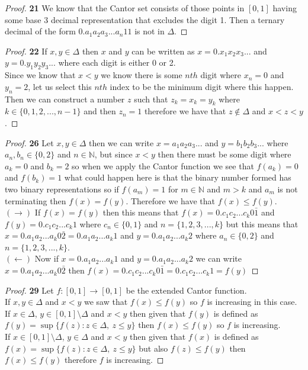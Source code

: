\documentclass[11pt]{article}
\newcommand{\N}{\mathbb{N}}
\theoremstyle{definition}
\begin{document}
	\begin{proof}{\textbf{21}}
        We know that the Cantor set consists of those points in $[0, 1]$ having some
        base 3 decimal representation that excludes the digit 1. Then a ternary decimal
        of the form $0.a_1a_2a_3...a_n11$ is not in $\Delta$.
    \end{proof}
	\begin{proof}{\textbf{22}}
        If $x,y \in \Delta$ then $x$ and $y$ can be written as $x=0.x_1x_2x_3...$
        and $y=0.y_1y_2y_3...$ where each digit is either 0 or 2.\\
        Since we know that $x<y$ we know there is some $nth$ digit where $x_n=0$ and
        $y_n=2$, let us select this $nth$ index to be the minimum digit where this
        happen. Then we can construct a number $z$ such that $z_k=x_k=y_k$ where 
        $k \in \{0,1,2,...,n-1\}$ and then $z_n = 1$ therefore we have that
        $z \notin \Delta$ and $x<z<y$.
    \end{proof}
	\begin{proof}{\textbf{26}}
        Let $x,y \in \Delta$ then we can write
        $x = a_1a_2a_3...$ and $y = b_1b_2b_3...$ where $a_n,b_n \in \{0,2\}$ and
        $n \in \N$, but since $x<y$ then there must be some digit where $a_k = 0$ and
        $b_k = 2$ so when we apply the Cantor function we see that $f(a_k) = 0$ and
        $f(b_k) = 1$ what could happen here is that the binary number formed has two
        binary representations so if $f(a_m) = 1$ for $m \in \N$ and $m > k$ and $a_m$
        is not terminating then $f(x) = f(y)$. Therefore we have that $f(x) \leq f(y)$.\\
        $(\rightarrow)$ If $f(x) = f(y)$ then this means that
        $f(x) = 0.c_1c_2... c_k0\bar{1}$ and $f(y) = 0.c_1c_2...c_k1$ where
        $c_n \in \{0,1\}$ and $n = \{1,2,3,...,k\}$ but this means that
        $x=0.a_1a_2...a_k0\bar{2} = 0.a_1a_2...a_k1$ and $y=0.a_1a_2...a_k2$
        where $a_n \in \{0,2\}$ and $n = \{1,2,3,...,k\}$.\\
        $(\leftarrow)$ Now if $x=0.a_1a_2...a_k1$ and $y=0.a_1a_2...a_k2$ we can write
        $x = 0.a_1a_2...a_k0\bar{2}$ then
        $f(x) = 0.c_1c_2...c_k0\bar{1} = 0.c_1c_2...c_k1 = f(y)$ 
    \end{proof}
\cleardoublepage
	\begin{proof}{\textbf{29}}
        Let $f: [0,1] \rightarrow [0,1]$ be the extended Cantor function.\\
        If $x,y \in \Delta$ and $x < y$ we saw that $f(x)\leq f(y)$ so $f$ is increasing
        in this case.\\
        If $x \in \Delta$, $y \in [0,1]\setminus \Delta$ and $x<y$ then given that
        $f(y)$ is defined as $f(y) = \sup\{f(z): z \in \Delta,~z \leq y\}$ then
        $f(x) \leq f(y)$ so $f$ is increasing.\\
        If $x \in [0,1]\setminus \Delta$, $y \in \Delta$ and $x<y$ then given that
        $f(x)$ is defined as $f(x) = \sup\{f(z): z \in \Delta,~z \leq y\}$ but also
        $f(z) \leq f(y)$ then $f(x) \leq f(y)$ therefore $f$ is increasing.
    \end{proof}
\end{document}
